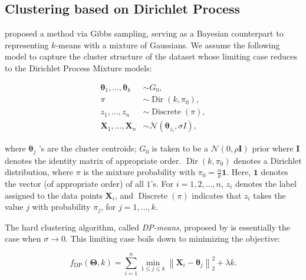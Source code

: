 \documentclass{article}
\newcommand{\bX}{\boldsymbol{X}}
\newcommand{\bTheta}{\boldsymbol{\Theta}}
\begin{document}
\subsection{Clustering based on Dirichlet Process}

\citet{DP-Means} proposed a method via Gibbs sampling, serving as a Bayesian counterpart to representing $k$-means with a mixture of Gaussians. We assume the following model to capture the cluster structure of the dataset whose limiting case reduces to the Dirichlet Process Mixture models:

\begin{align*}
\boldsymbol{\theta}_1, \ldots, \boldsymbol{\theta}_{{k}} & \sim {G}_0, \\
\pi & \sim \operatorname{Dir}\left({k}, \pi_0\right), \\
{z}_1, \ldots, {z}_{{n}} & \sim \operatorname{Discrete}(\pi), \\
{\bX}_1, \ldots, {\bX}_{{n}} & \sim \mathcal{N}\left(\boldsymbol{\theta}_{{z}_{{i}}}, \sigma I\right),
\end{align*}

where $\boldsymbol{\theta}_{{j}}$ 's are the cluster centroids; ${G}_0$ is taken to be a $\mathcal{N}(0, \rho \mathbf{I})$ prior where $\mathbf{I}$ denotes the identity matrix of appropriate order. $\operatorname{Dir}\left({k}, \pi_0\right)$ denotes a Dirichlet distribution, where $\pi$ is the mixture probability with $\pi_0=\frac{\alpha}{k} \mathbf{1}$. Here, $\mathbf{1}$  denotes the vector (of appropriate order) of all $1$'s. For $i = 1,2,\ldots,n$, ${z}_{{i}}$ denotes the label assigned to the data points ${\bX}_{{i}}$, and  $\operatorname{Discrete}(\pi)$ indicates that ${z}_{{i}}$ takes the value $j$ with probability $\pi_{{j}}$, for ${j}=1, \ldots, {k}$.

The hard clustering algorithm, called \textit{DP-means}, proposed by \citet{DP-Means} is essentially the case when $\sigma \to 0$. This limiting case boils down to minimizing the objective:

\begin{equation}\label{dp-means-obj}
    f_{\operatorname{DP}} (\bTheta, k)=\sum_{i=1}^n \min _{1 \leq j \leq k}\left\|{\bX}_i-\boldsymbol{\theta}_j\right\|_2^2+\lambda k.
\end{equation}
\end{document}
